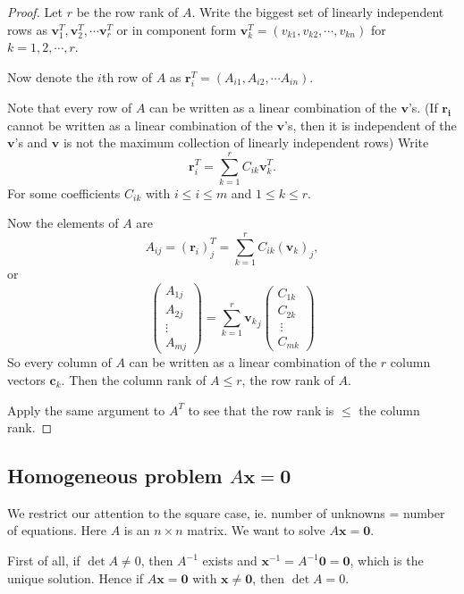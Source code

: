 \documentclass[a4paper]{article}
\begin{document}
\begin{proof}
  Let $r$ be the row rank of $A$. Write the biggest set of linearly independent rows as $\mathbf{v}_1^T, \mathbf{v}_2^T, \cdots \mathbf{v}_r^T$ or in component form $\mathbf{v}_k^T = (v_{k1}, v_{k2}, \cdots, v_{kn})$ for $k = 1, 2, \cdots, r$.

  Now denote the $i$th row of $A$ as $\mathbf{r}_i^T = (A_{i1}, A_{i2}, \cdots A_{in})$.

  Note that every row of $A$ can be written as a linear combination of the $\mathbf{v}$'s. (If $\mathbf{r_i}$ cannot be written as a linear combination of the $\mathbf{v}$'s, then it is independent of the $\mathbf{v}$'s and $\mathbf{v}$ is not the maximum collection of linearly independent rows) Write
  \[
    \mathbf{r}_i^T = \sum_{k = 1}^r C_{ik}\mathbf{v}_{k}^T.
  \]
  For some coefficients $C_{ik}$ with $i \leq i\leq m$ and $1 \leq k \leq r$.

  Now the elements of $A$ are
  \[
    A_{ij} = (\mathbf{r}_i)^T_j = \sum_{k = 1}^r C_{ik}(\mathbf{v}_k)_j,
  \]
  or
  \[
    \begin{pmatrix}
      A_{1j}\\
      A_{2j}\\
      \vdots\\
      A_{mj}
    \end{pmatrix} = \sum_{k = 1}^r {\mathbf{v}_k}_j
    \begin{pmatrix}
      C_{1k}\\
      C_{2k}\\\
      \vdots\\
      C_{mk}
    \end{pmatrix}
  \]
  So every column of $A$ can be written as a linear combination of the $r$ column vectors $\mathbf{c}_k$. Then the column rank of $A \leq r$, the row rank of $A$.

  Apply the same argument to $A^T$ to see that the row rank is $\leq$ the column rank.
\end{proof}

\subsection{Homogeneous problem \texorpdfstring{$A\mathbf{x} = \mathbf{0}$}{Ax = 0}}
We restrict our attention to the square case, ie. number of unknowns = number of equations. Here $A$ is an $n\times n$ matrix. We want to solve $A\mathbf{x} = \mathbf{0}$.

First of all, if $\det A\not=0$, then $A^{-1}$ exists and $\mathbf{x}^{-1} = A^{-1}\mathbf{0} = \mathbf{0}$, which is the unique solution. Hence if $A\mathbf{x} = \mathbf{0}$ with $\mathbf{x} \not= \mathbf{0}$, then $\det A = 0$.
\end{document}
